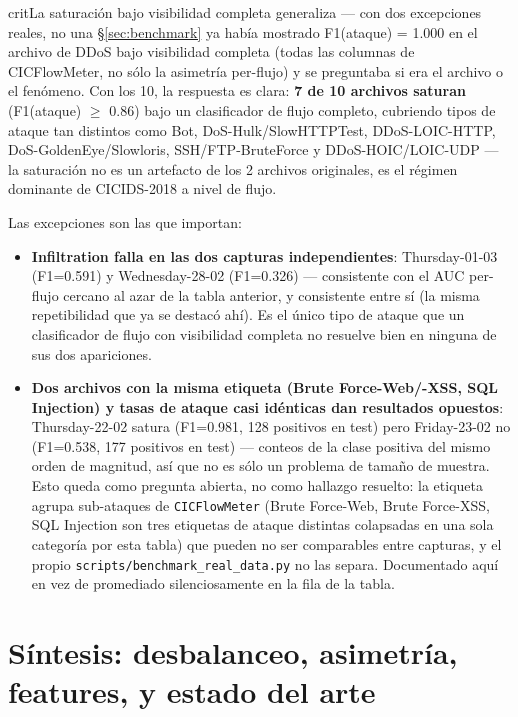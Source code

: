 \documentclass[11pt]{article}
\newcommand{\code}[1]{\texttt{\small #1}}
\begin{document}
\begin{cbox}{crit}{La saturación bajo visibilidad completa generaliza --- con dos excepciones reales, no una}
\S\ref{sec:benchmark} ya había mostrado F1(ataque) = 1.000 en el archivo de DDoS bajo visibilidad
completa (todas las columnas de CICFlowMeter, no sólo la asimetría per-flujo) y se preguntaba si
era el archivo o el fenómeno. Con los 10, la respuesta es clara: \textbf{7 de 10 archivos saturan}
(F1(ataque) $\geq$ 0.86) bajo un clasificador de flujo completo, cubriendo tipos de ataque tan
distintos como Bot, DoS-Hulk/SlowHTTPTest, DDoS-LOIC-HTTP, DoS-GoldenEye/Slowloris, SSH/FTP-BruteForce
y DDoS-HOIC/LOIC-UDP --- la saturación no es un artefacto de los 2 archivos originales, es el
régimen dominante de CICIDS-2018 a nivel de flujo.

Las excepciones son las que importan:
\begin{itemize}[leftmargin=1.4em,itemsep=2pt]
\item \textbf{Infiltration falla en las dos capturas independientes}: Thursday-01-03 (F1=0.591) y
  Wednesday-28-02 (F1=0.326) --- consistente con el AUC per-flujo cercano al azar de la tabla
  anterior, y consistente entre sí (la misma repetibilidad que ya se destacó ahí). Es el único tipo
  de ataque que un clasificador de flujo con visibilidad completa no resuelve bien en ninguna de
  sus dos apariciones.
\item \textbf{Dos archivos con la misma etiqueta (Brute Force-Web/-XSS, SQL Injection) y tasas de
  ataque casi idénticas dan resultados opuestos}: Thursday-22-02 satura (F1=0.981, 128 positivos en
  test) pero Friday-23-02 no (F1=0.538, 177 positivos en test) --- conteos de la clase positiva del
  mismo orden de magnitud, así que no es sólo un problema de tamaño de muestra. Esto queda como
  pregunta abierta, no como hallazgo resuelto: la etiqueta agrupa sub-ataques de \code{CICFlowMeter}
  (Brute Force-Web, Brute Force-XSS, SQL Injection son tres etiquetas de ataque distintas colapsadas
  en una sola categoría por esta tabla) que pueden no ser comparables entre capturas, y el propio
  \code{scripts/benchmark\_real\_data.py} no las separa. Documentado aquí en vez de promediado
  silenciosamente en la fila de la tabla.
\end{itemize}
\end{cbox}

\section{Síntesis: desbalanceo, asimetría, features, y estado del arte}
\label{sec:sintesis}
\end{document}
